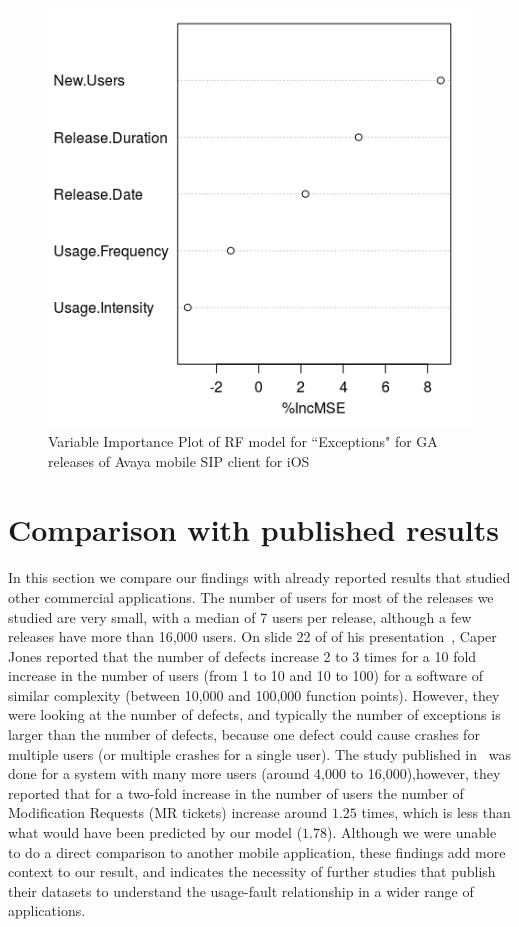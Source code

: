 \documentclass[smallextended]{svjour3}       %
\begin{document}
\begin{figure}[!t]
\centering
\includegraphics[width=0.4\linewidth]{rfI}%
\caption{Variable Importance Plot of RF model for ``Exceptions" for GA releases of Avaya mobile SIP client for iOS}
\label{fig:rfI}
\end{figure}

\section{Comparison with published results}\label{sec:compare}
In this section we compare our findings with already reported results that studied other commercial applications. 
The number of users for most of the releases we studied are very small, with a 
median of 7 users per release, although a few releases have more than 16,000 users.
On slide 22 of of his presentation~\cite{caper}, Caper Jones reported that the
number of defects increase 2 to 3 times for a 10 fold increase in the number of users
(from 1 to 10 and 10 to 100) for a software of similar complexity (between 10,000
and 100,000 function points). However, they were looking at the number of 
defects, and typically the number of 
exceptions is larger than the number of defects, because one defect could cause crashes for multiple users (or multiple crashes for a single user). The study published in~\cite{IQ08} was done for a system with many 
more users (around 4,000 to 16,000),however, they reported that for a two-fold increase in the 
number of users the number of Modification Requests (MR tickets) increase around $1.25$ times, 
which is less than what would have been predicted by our model ($1.78$). Although we
were unable to do a direct comparison to another mobile application, these findings add more context to our result, and indicates the necessity of further studies that publish their datasets to understand the usage-fault relationship in a wider range of applications.
\end{document}
